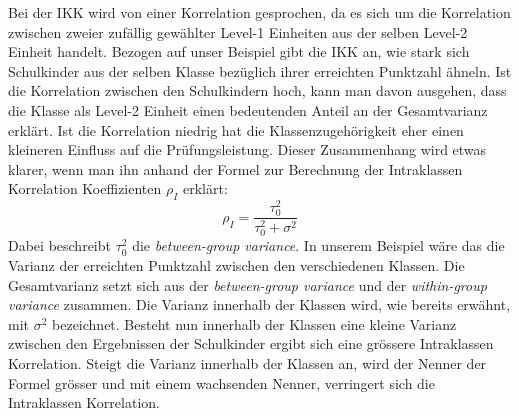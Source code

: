 \documentclass[12pt]{article}\usepackage[]{graphicx}\usepackage[]{color}
\begin{document}
Bei der IKK wird von einer Korrelation gesprochen, da es sich um die Korrelation zwischen zweier zufällig gewählter Level-1 Einheiten aus der selben Level-2 Einheit handelt. Bezogen auf unser Beispiel gibt die IKK an, wie stark sich Schulkinder aus der selben Klasse bezüglich ihrer erreichten Punktzahl ähneln. Ist die Korrelation zwischen den Schulkindern hoch, kann man davon ausgehen, dass die Klasse als Level-2 Einheit einen bedeutenden Anteil an der Gesamtvarianz erklärt. Ist die Korrelation niedrig hat die Klassenzugehörigkeit eher einen kleineren Einfluss auf die Prüfungsleistung. Dieser Zusammenhang wird etwas klarer, wenn man ihn anhand der Formel zur Berechnung der Intraklassen Korrelation Koeffizienten $\rho_{I}$ erklärt:
\begin{equation} \label{eq:icc}
\rho_{I} = \dfrac{\tau_{0}^{2}}{\tau_{0}^{2} + \sigma^{2}}
\end{equation} 
Dabei beschreibt $\tau_{0}^2$ die \textit{between-group variance}. In unserem Beispiel wäre das die Varianz der erreichten Punktzahl zwischen den verschiedenen Klassen. Die Gesamtvarianz setzt sich aus der \textit{between-group variance} und der \textit{within-group variance} zusammen. Die Varianz innerhalb der Klassen wird, wie bereits erwähnt, mit $\sigma^2$ bezeichnet. Besteht nun innerhalb der Klassen eine kleine Varianz zwischen den Ergebnissen der Schulkinder ergibt sich eine grössere Intraklassen Korrelation. Steigt die Varianz innerhalb der Klassen an, wird der Nenner der Formel grösser und mit einem wachsenden Nenner, verringert sich die Intraklassen Korrelation.
\end{document}
